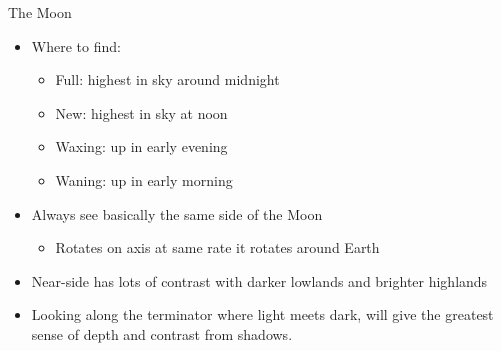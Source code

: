\documentclass[pdf, aspectratio=169]{beamer}
\begin{document}
\begin{frame}{The Moon}
	\begin{itemize}
		\item Where to find:
			\begin{itemize}
				\item Full: highest in sky around midnight
				\item New: highest in sky at noon
				\item Waxing: up in early evening
				\item Waning: up in early morning
			\end{itemize}
		\item Always see basically the same side of the Moon
			\begin{itemize}
				\item Rotates on axis at same rate it rotates around Earth
			\end{itemize}
		\item Near-side has lots of contrast with darker lowlands and brighter highlands
		\item Looking along the \alert{terminator} where light meets dark, will give the greatest sense of depth and contrast from shadows.
	\end{itemize}
\end{frame}
\end{document}

